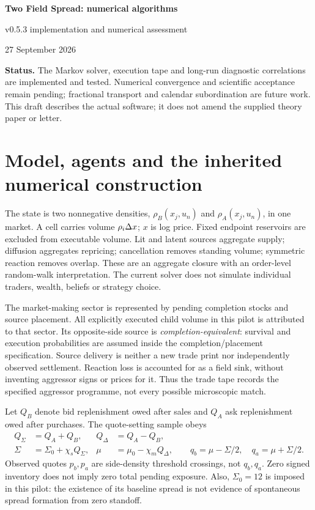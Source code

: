 \documentclass[11pt,a4paper]{article}
\begin{document}
\begin{center}
{\Large\bfseries Two Field Spread: numerical algorithms}\par
{\large v0.5.3 implementation and numerical assessment}\par
27 September 2026
\end{center}
\textbf{Status.} The Markov solver, execution tape and long-run diagnostic correlations are
implemented and tested. Numerical convergence and scientific acceptance
remain pending; fractional transport and calendar subordination are future work. This draft describes the actual
software; it does not amend the supplied theory paper or letter.

\section{Model, agents and the inherited numerical construction}
The state is two nonnegative densities, $\rho_B(x_j,u_n)$ and
$\rho_A(x_j,u_n)$, in one market. A cell carries volume $\rho_i\Delta x$;
$x$ is log price. Fixed endpoint reservoirs are excluded from executable
volume. Lit and latent sources aggregate supply; diffusion aggregates
repricing; cancellation removes standing volume; symmetric reaction removes
overlap. These are an aggregate closure with an order-level random-walk
interpretation. The current solver does not simulate individual traders,
wealth, beliefs or strategy choice.

The market-making sector is represented by pending completion stocks and
source placement. All explicitly executed child volume in this pilot is
attributed to that sector. Its opposite-side source is
\emph{completion-equivalent}: survival and execution probabilities are
assumed inside the completion/placement specification. Source delivery is
neither a new trade print nor independently observed settlement. Reaction
loss is accounted for as a field sink, without inventing aggressor signs or
prices for it. Thus the trade tape records the specified aggressor programme,
not every possible microscopic match.

Let $Q_B$ denote bid replenishment owed after sales and $Q_A$ ask
replenishment owed after purchases. The quote-setting sample obeys
\begin{align}
 Q_\Sigma&=Q_A+Q_B,& Q_\Delta&=Q_A-Q_B,\\
 \Sigma&=\Sigma_0+\chi_s Q_\Sigma,&
 \mu&=\mu_0-\chi_m Q_\Delta,\qquad
 q_b=\mu-\Sigma/2,\quad q_a=\mu+\Sigma/2.
\end{align}
Observed quotes $p_b,p_a$ are side-density threshold crossings, not $q_b,q_a$.
Zero signed inventory does not imply zero total pending exposure. Also,
$\Sigma_0=12$ is imposed in this pilot: the existence of its baseline spread
is not evidence of spontaneous spread formation from zero standoff.
\end{document}
